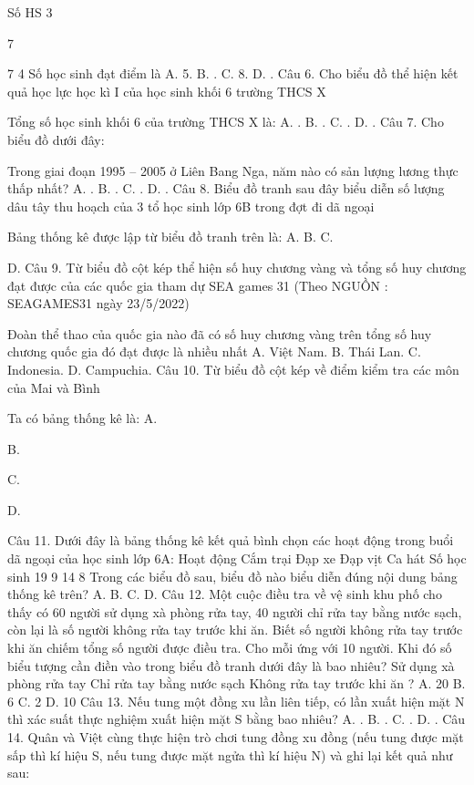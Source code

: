Số HS	  
3	  

7 	 

7	4	 
Số học sinh đạt điểm    là
A. 5.	 B.  .	C. 8.	 D.  .
Câu 6. Cho biểu đồ thể hiện kết quả học lực học kì I của học sinh khối 6 trường THCS X

Tổng số học sinh khối 6 của trường THCS X là: 
A.  .	B.  .	C.  .	D.  .
Câu 7. Cho biểu đồ dưới đây:

Trong giai đoạn 1995 – 2005 ở Liên Bang Nga, năm nào có sản lượng lương thực thấp nhất?
A.  .	B.  .	C.  .	D.  .
Câu 8. Biểu đồ tranh sau đây biểu diễn số lượng dâu tây thu hoạch của 3 tổ học sinh lớp 6B trong đợt đi dã ngoại

Bảng thống kê được lập từ biểu đồ tranh trên là: 
A.  B. 
C. 

D.  
Câu 9. Từ biểu đồ cột kép thể hiện số huy chương vàng và tổng số huy chương đạt được của các quốc gia tham dự SEA games 31 (Theo NGUỒN : SEAGAMES31 ngày 23/5/2022)

Đoàn thể thao của quốc gia nào đã có số huy chương vàng trên tổng số huy chương quốc gia đó đạt được là nhiều nhất
A. Việt Nam.		B. Thái Lan.		C. Indonesia.		D. Campuchia.
Câu 10. Từ biểu đồ cột kép về điểm kiểm tra các môn của Mai và Bình

Ta có bảng thống kê là:
A. 


B. 

C.

D.

Câu 11. Dưới đây là bảng thống kê kết quả bình chọn các hoạt động trong buổi dã ngoại của học sinh lớp 6A:
Hoạt động	Cắm trại	Đạp xe	Đạp vịt	Ca hát
Số học sinh  	19	9	14	8
Trong các biểu đồ sau, biểu đồ nào biểu diễn đúng nội dung bảng thống kê trên?
A.           B.  
C.           D.  
Câu 12. Một cuộc điều tra về vệ sinh khu phố cho thấy có 60 người sử dụng xà phòng rửa tay, 40 người chỉ rửa tay bằng nước sạch, còn lại là số người không rửa tay trước khi ăn. Biết số người không rửa  tay trước khi ăn chiếm   tổng số người được điều tra.
Cho mỗi   ứng với 10 người. Khi đó số biểu tượng   cần điền vào trong biểu đồ tranh dưới đây là bao nhiêu?
Sử dụng xà phòng rửa tay	      
Chỉ rửa tay bằng nước sạch	    
Không rửa tay trước khi ăn	?
A. 20	B. 6	C. 2	D. 10
Câu 13. Nếu tung một đồng xu   lần liên tiếp, có   lần xuất hiện mặt N thì xác suất thực nghiệm xuất hiện mặt S bằng bao nhiêu?
A.  .	B.  .	C.  .	D.  .
Câu 14. Quân và Việt cùng thực hiện trò chơi tung đồng xu   đồng (nếu tung được mặt sấp thì kí hiệu S, nếu tung được mặt ngửa thì kí hiệu N) và ghi lại kết quả như sau:

